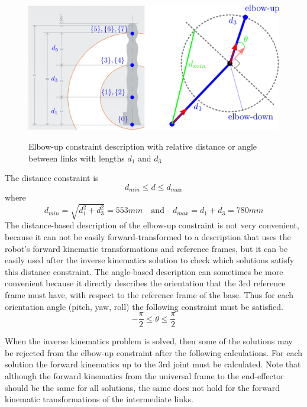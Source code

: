 \begin{center}
\begin{figure}[!htb]
\centering
\includegraphics[width=\textwidth]{images/elbow-up-constraint-geometry.png}\\
\caption{Elbow-up constraint description with relative distance or angle between links with lengths $d_1$ and $d_3$}
\label{elbow-up-constraint-geometry}
\end{figure}
\end{center}

The distance constraint is
\begin{equation}
\label{eq:elbow-up-constraint-distance-inequality}
d_{min} \leq d \leq d_{max}
\end{equation}
where
\[
d_{min} = \sqrt{d_1^2 + d_3^2} = 553mm  \quad \textrm{and} \quad  d_{max} = d_1 + d_3 = 780mm
\]
The distance-based description of the elbow-up constraint is not very convenient, because it can not be easily forward-transformed to a description that uses the robot's forward kinematic transformations and reference frames, 
but it can be easily used after the inverse kinematics solution to check which solutions satisfy this distance constraint. 
The angle-based description can sometimes be more convenient because it directly describes the orientation that the 3rd reference frame must have, with respect to the reference frame of the base. Thus for each orientation 
angle (pitch, yaw, roll) the following constraint must be satisfied.\\
\begin{equation}
\label{eq:elbow-up-constraint-angle-inequality}
-\frac{\pi}{2} \leq θ \leq \frac{\pi}{2}
\end{equation}

When the inverse kinematics problem is solved, then some of the solutions may be rejected from the elbow-up constraint after the following calculations. For each solution the forward kinematics up to the 3rd joint must be 
calculated. Note that although the forward kinematics from the universal frame to the end-effector should be the same for all solutions, the same does not hold for the forward kinematic transformations of the intermediate 
links.

